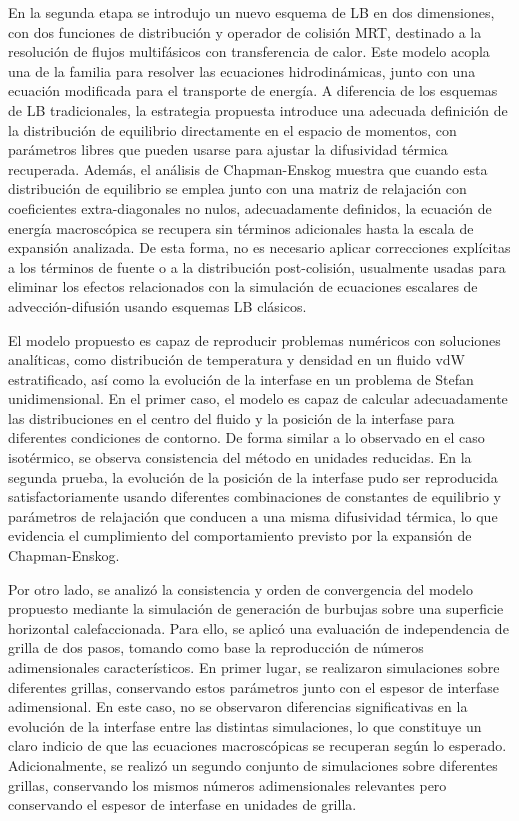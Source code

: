 \bigskip

En la segunda etapa se introdujo un nuevo esquema de LB en dos dimensiones, con dos funciones de distribuci\'on y operador de colisi\'on MRT, destinado a la resoluci\'on de flujos multif\'asicos con transferencia de calor. Este modelo acopla una \lbe{} de la familia \pp{} para resolver las ecuaciones hidrodin\'amicas, junto con una ecuaci\'on modificada para el transporte de energ\'ia. A diferencia de los esquemas de LB tradicionales, la estrategia propuesta introduce una adecuada definici\'on de la distribuci\'on de equilibrio directamente en el espacio de momentos, con par\'ametros libres que pueden usarse para ajustar la difusividad t\'ermica recuperada. Adem\'as, el an\'alisis de Chapman-Enskog muestra que cuando esta distribuci\'on de equilibrio se emplea junto con una matriz de relajaci\'on con coeficientes extra-diagonales no nulos, adecuadamente definidos, la ecuaci\'on de energ\'ia macrosc\'opica se recupera sin t\'erminos adicionales hasta la escala de expansi\'on analizada. De esta forma, no es necesario aplicar correcciones expl\'icitas a los t\'erminos de fuente o a la distribuci\'on post-colisi\'on, usualmente usadas para eliminar los efectos relacionados con la simulaci\'on de ecuaciones escalares de advecci\'on-difusi\'on usando esquemas LB cl\'asicos.

El modelo propuesto es capaz de reproducir problemas num\'ericos con soluciones anal\'iticas, como distribuci\'on de temperatura y densidad en un fluido vdW estratificado, as\'i como la evoluci\'on de la interfase en un problema de Stefan unidimensional. En el primer caso, el modelo es capaz de calcular adecuadamente las distribuciones en el centro del fluido y la posici\'on de la interfase para diferentes condiciones de contorno. De forma similar a lo observado en el caso isot\'ermico, se observa consistencia del m\'etodo en unidades reducidas. En la segunda prueba, la evoluci\'on de la posici\'on de la interfase pudo ser reproducida satisfactoriamente usando diferentes combinaciones de constantes de equilibrio y par\'ametros de relajaci\'on que conducen a una misma difusividad t\'ermica, lo que evidencia el cumplimiento del comportamiento previsto por la expansi\'on de Chapman-Enskog.

Por otro lado, se analiz\'o la consistencia y orden de convergencia del modelo propuesto mediante la simulaci\'on de generaci\'on de burbujas sobre una superficie horizontal calefaccionada. Para ello, se aplic\'o una evaluaci\'on de independencia de grilla de dos pasos, tomando como base la reproducci\'on de n\'umeros adimensionales caracter\'isticos. En primer lugar, se realizaron simulaciones sobre diferentes grillas, conservando estos par\'ametros junto con el espesor de interfase adimensional. En este caso, no se observaron diferencias significativas en la evoluci\'on de la interfase entre las distintas simulaciones, lo que constituye un claro indicio de que las ecuaciones macrosc\'opicas se recuperan seg\'un lo esperado. Adicionalmente, se realiz\'o un segundo conjunto de simulaciones sobre diferentes grillas, conservando los mismos n\'umeros adimensionales relevantes pero conservando el espesor de interfase en unidades de grilla.

